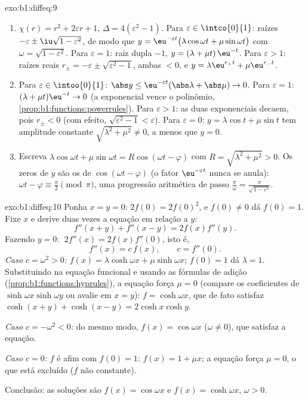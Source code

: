 \begin{solution}{exo:b1:diffeq:9}
\begin{enumerate}
  \item $\chi(r) = r^2 + 2\varepsilon r + 1$, $\Delta = 4(\varepsilon^2
        - 1)$.
        Para $\varepsilon \in \intco{0}{1}$: raízes $-\varepsilon \pm
        \iu\sqrt{1 - \varepsilon^2}$, de modo que
        $y = \eu^{-\varepsilon t}\bigl(\lambda\cos\omega t +
        \mu\sin\omega t\bigr)$ com $\omega = \sqrt{1 -
        \varepsilon^2}$.
        Para $\varepsilon = 1$: raiz dupla $-1$, $y = (\lambda + \mu
        t)\,\eu^{-t}$.
        Para $\varepsilon > 1$: raízes reais $r_\pm = -\varepsilon \pm
        \sqrt{\varepsilon^2 - 1}$, ambas $< 0$, e $y =
        \lambda\eu^{r_+t} + \mu\eu^{r_-t}$.
  \item Para $\varepsilon \in \intoo{0}{1}$: $\abs y \leq
        \eu^{-\varepsilon t}(\abs\lambda + \abs\mu) \to 0$. Para
        $\varepsilon = 1$: $(\lambda + \mu t)\eu^{-t} \to 0$
        (a exponencial vence o polinômio,
        \cref{prop:b1:functions:powerrules}). Para $\varepsilon > 1$:
        as duas exponenciais decaem, pois $r_\pm < 0$ (com efeito,
        $\sqrt{\varepsilon^2 - 1} < \varepsilon$). Para $\varepsilon =
        0$: $y = \lambda\cos t + \mu\sin t$ tem amplitude constante
        $\sqrt{\lambda^2 + \mu^2} \neq 0$, a menos que $y = 0$.
  \item Escreva $\lambda\cos\omega t + \mu\sin\omega t =
        R\cos(\omega t - \varphi)$ com $R = \sqrt{\lambda^2 + \mu^2}
        > 0$. Os zeros de $y$ são os de $\cos(\omega t -
        \varphi)$ (o fator $\eu^{-\varepsilon t}$ nunca
        se anula): $\omega t - \varphi \equiv \frac\pi2 \pmod \pi$,
        uma progressão aritmética de passo $\frac{\pi}{\omega} =
        \frac{\pi}{\sqrt{1 - \varepsilon^2}}$.
\end{enumerate}
\end{solution}

\begin{solution}{exo:b1:diffeq:10}
Ponha $x = y = 0$: $2f(0) = 2f(0)^2$, e $f(0) \neq 0$ dá $f(0) =
1$. Fixe $x$ e derive duas vezes a equação em relação a $y$:
\[
f''(x+y) + f''(x-y) = 2 f(x) f''(y) .
\]
Fazendo $y = 0$: $\;2f''(x) = 2 f(x) f''(0)$, isto é,
\[
f''(x) = c\,f(x), \qquad c = f''(0).
\]
\emph{Caso $c = \omega^2 > 0$:} $f(x) = \lambda\cosh\omega x +
\mu\sinh\omega x$; $f(0) = 1$ dá $\lambda = 1$. Substituindo na
equação funcional e usando as fórmulas de adição
(\cref{prop:b1:functions:hyprules}), a equação força $\mu = 0$
(compare os coeficientes de $\sinh\omega x \sinh\omega y$ ou
avalie em $x = y$): $f = \cosh\omega x$, que de fato satisfaz
$\cosh(x+y) + \cosh(x-y) = 2\cosh x\cosh y$.

\emph{Caso $c = -\omega^2 < 0$:} do mesmo modo, $f(x) = \cos\omega x$
($\omega \neq 0$), que satisfaz a equação.

\emph{Caso $c = 0$:} $f$ é afim com $f(0) = 1$: $f(x) = 1 + \mu x$;
a equação força $\mu = 0$, o que está excluído ($f$ não constante).

Conclusão: as soluções são $f(x) = \cos\omega x$ e $f(x) =
\cosh\omega x$, $\omega > 0$.
\end{solution}

